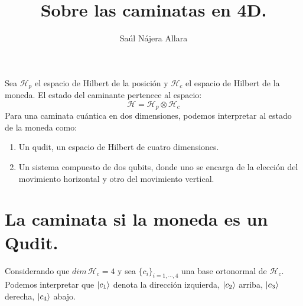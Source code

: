 \documentclass[12pt,a4paper]{article}
\title{Sobre las caminatas en 4D.}
\author{Saúl Nájera Allara}
\date{}
\begin{document}
\maketitle
Sea $\mathcal{H}_p$ el espacio de Hilbert de la posición y $\mathcal{H}_c$ el espacio de Hilbert de la moneda. El estado del caminante 
pertenece al espacio:
\begin{equation*}
\mathcal{H}=\mathcal{H}_p \otimes \mathcal{H}_c
\end{equation*}
Para una caminata cuántica en dos dimensiones, podemos interpretar al estado de la moneda como:
\begin{enumerate}
    \item Un qudit, un espacio de Hilbert de cuatro dimensiones.
    \item Un sistema compuesto de dos qubits, donde uno se encarga de la elección del movimiento horizontal y otro del movimiento vertical.
\end{enumerate}
\section{La caminata si la moneda es un Qudit.}
Considerando que $dim\, \mathcal{H}_c=4$ y sea $\{c_i\}_{i=1,\cdots,4}$ una base ortonormal de $\mathcal{H}_c$.
Podemos interpretar que $\ket{c_1}$ denota la dirección izquierda, $\ket{c_2}$ arriba, $\ket{c_3}$ derecha, $\ket{c_4}$ abajo.
\end{document}
